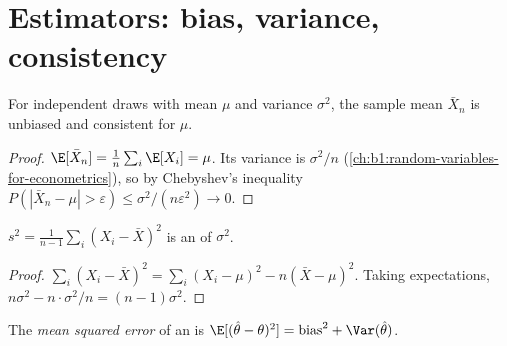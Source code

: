 \section{Estimators: bias, variance, consistency}\label{sec:b1:sampling-and-inference:estimators}

\begin{proposition}\label{prop:b1:sampling-and-inference:mean}
For independent draws with mean $\mu$ and variance $\sigma^2$, the sample mean $\bar X_n$ is
unbiased and consistent for $\mu$.
\end{proposition}

\begin{proof}
$\E[\bar X_n] = \frac1n\sum_i \E[X_i] = \mu$. Its variance is $\sigma^2/n$ (\cref{ch:b1:random-variables-for-econometrics}),
so by Chebyshev's inequality $P(|\bar X_n - \mu| > \varepsilon) \le \sigma^2/(n\varepsilon^2) \to 0$.
\end{proof}

\begin{proposition}[Dividing by $n - 1$]\label{prop:b1:sampling-and-inference:variance}
$s^2 = \frac1{n-1}\sum_i (X_i - \bar X)^2$ is an  of $\sigma^2$.
\end{proposition}

\begin{proof}
$\sum_i (X_i - \bar X)^2 = \sum_i (X_i - \mu)^2 - n(\bar X - \mu)^2$. Taking expectations,
$n\sigma^2 - n \cdot \sigma^2/n = (n - 1)\sigma^2$.
\end{proof}

\label{lst:b1:sampling-and-inference:variance}

\label{out:b1:sampling-and-inference:variance}

\begin{definition}\label{def:b1:sampling-and-inference:mse}
The \emph{mean squared error} of an  is $\E[(\hat\theta - \theta)^2] = \text{bias}^2 + \Var(\hat\theta)$.
\end{definition}

\label{lst:b1:sampling-and-inference:bias-variance}

